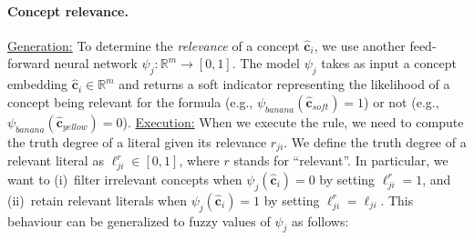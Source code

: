\paragraph{Concept relevance.}
\underline{Generation:} To determine the \emph{relevance} of a concept $\mathbf{\hat{c}}_i$, we use another feed-forward neural network $\psi_j: \mathbb{R}^m \rightarrow [0,1]$. The model $\psi_j$ takes as input a concept embedding $\hat{\mathbf{c}}_i \in \mathbb{R}^m$ and returns a soft indicator representing the likelihood of a concept being relevant for the formula (e.g., $\psi_{\textit{banana}}(\hat{\mathbf{c}}_{\textit{soft}}) = 1$) or not (e.g., $\psi_{\textit{banana}}(\hat{\mathbf{c}}_{\textit{yellow}}) = 0$).
\underline{Execution:} When we execute the rule, we need to compute the truth degree of a literal given its relevance $r_{ji}$. We define the truth degree of a relevant literal as $\ell^r_{ji} \in [0,1]$, where $r$ stands for ``relevant''. In particular, we want to  \mbox{(i) filter} irrelevant concepts when $\psi_j(\hat{\mathbf{c}}_i) = 0$ by setting $\ell^r_{ji}=1$, and  \mbox{(ii) retain} relevant literals when $\psi_j(\hat{\mathbf{c}}_i) = 1$ by setting $\ell^r_{ji}= \ell_{ji}$. This behaviour can be generalized to fuzzy values of $\psi_j$ as follows: 

